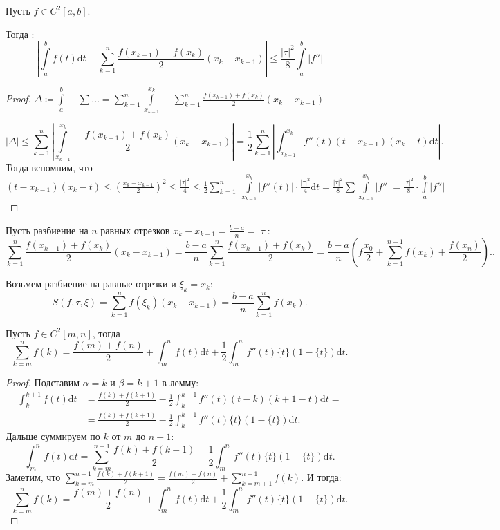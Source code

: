 \begin{theorem}
    Пусть $f \in C^2[a, b]$.

    Тогда : \[\left|\int\limits_a^b f(t) \mathrm{d}t - \sum_{k=1}^n \frac{f(x_{k-1}) + f(x_k)}{2}(x_k - x_{k-1})\right| \le \frac{|\tau|^2}{8} \int\limits_a^b |f''|\]
\end{theorem}
\begin{proof}
    $\Delta \coloneqq \int\limits_a^b - \sum \ldots = \sum\limits_{k=1}^n \int\limits_{x_{k-1}}^{x_k} - \sum\limits_{k=1}^n \frac{f(x_{k-1}) + f(x_k)}{2}(x_k - x_{k-1})$

    \[
        |\Delta| \le  \sum\limits_{k=1}^n |\int\limits_{x_{k-1}}^{x_k} - \frac{f(x_{k-1}) + f(x_k)}{2}(x_k - x_{k-1})| = \frac{1}{2} \sum\limits_{k=1}^n \left| \int_{x_{k-1}}^{x_k} f''(t)(t-x_{k-1})(x_k - t)\mathrm{d}t\right|
    .\] Тогда вспомним, что $(t-x_{k-1})(x_k - t) \le \left( \frac{x_k - x_{k-1}}{2}\right)^2 \le \frac{|\tau|^2}{4} \le \frac{1}{2} \sum\limits_{k=1}^n\ \int\limits_{x_{k-1}}^{x_k}|f''(t)| \cdot \frac{|\tau|^2}{4} \mathrm{d}t = \frac{|\tau|^2}{8} \sum \int\limits_{x_{k-1}}^{x_k} |f''| = \frac{|\tau|^2}{8} \cdot \int\limits_a^b |f''|$
\end{proof}
\begin{remark}
    Пусть разбиение на $n$ равных отрезков  $x_k - x_{k-1} = \frac{b-a}{n} = |\tau|$:
    \[
        \sum_{k=1}^n \frac{f(x_{k-1}) + f(x_k)}{2}(x_k - x_{k-1}) = \frac{b-a}{n} \sum_{k=1}^n \frac{f(x_{k-1}) + f(x_k)}{2} = \frac{b-a}{n}(f\frac{x_0}{2} + \sum_{k=1}^{n-1}f(x_k) + \frac{f(x_n)}{2}).
    .\] 
\end{remark}
\begin{remark}
    Возьмем разбиение на равные отрезки и $\xi_k = x_k$:
     \[
         S(f, \tau, \xi) = \sum_{k=1}^n f(\xi_k)(x_k - x_{k-1}) = \frac{b-a}{n} \sum_{k=1}^n f(x_k)
    .\] 
\end{remark}
\begin{theorem}
    Пусть $f \in C^2[m, n]$, тогда
     \[
         \sum_{k=m}^n f(k) = \frac{f(m) + f(n)}{2} + \int_m^n f(t) \mathrm{d}t + \frac{1}{2} \int_m^n f''(t)\{t\}(1-\{t\})\mathrm{d}t
    .\]
\end{theorem}
\begin{proof}
    Подставим $\alpha = k$ и  $\beta = k + 1$ в лемму:
    \begin{align*}
        \int_{k}^{k+1} f(t) \mathrm{d}t &= \frac{f(k) + f(k + 1)}{2} - \frac{1}{2} \int_k^{k+1} f''(t)(t-k)(k+1-t) \mathrm{d}t = \\ &= \frac{f(k) + f(k + 1)}{2} - \frac{1}{2} \int_{k}^{k+1} f''(t) \{t\}(1-\{t\}) \mathrm{d}t
        .\end{align*} Дальше суммируем по $k$ от  $m$ до  $n-1$:  \[
    \int_m^n f(t) \mathrm{d}t = \sum_{k=m}^{n-1} \frac{f(k) + f(k + 1)}{2} - \frac{1}{2} \int_m^n f''(t)\{t\}(1-\{t\}) \mathrm{d}t
.\] Заметим, что $\sum\limits_{k=m}^{n-1} \frac{f(k) + f(k + 1)}{2} = \frac{f(m) + f(n)}{2} + \sum_{k=m+1}^{n-1} f(k)$. И тогда: 
\[
    \sum_{k=m}^n f(k) = \frac{f(m) + f(n)}{2} + \int_m^n f(t)\mathrm{d}t + \frac{1}{2} \int_m^n f''(t)\{t\}(1-\{t\})\mathrm{d}t
.\] 
\end{proof}

